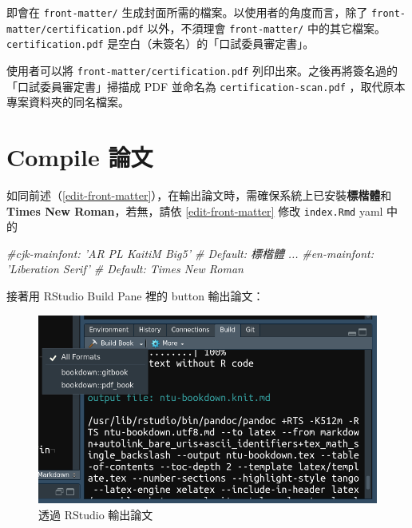 \documentclass[oneside]{book}
\newenvironment{Shaded}{\begin{snugshade}}{\end{snugshade}}
\newcommand{\CommentTok}[1]{\textcolor[rgb]{0.56,0.35,0.01}{\textit{#1}}}
\theoremstyle{definition}
\theoremstyle{definition}
\theoremstyle{definition}
\theoremstyle{remark}
\begin{document}
即會在 \texttt{front-matter/} 生成封面所需的檔案。以使用者的角度而言，除了 \texttt{front-matter/certification.pdf} 以外，不須理會 \texttt{front-matter/} 中的其它檔案。\texttt{certification.pdf} 是空白（未簽名）的「口試委員審定書」。

使用者可以將 \texttt{front-matter/certification.pdf} 列印出來。之後再將簽名過的「口試委員審定書」掃描成 PDF 並命名為 \texttt{certification-scan.pdf} ，取代原本專案資料夾的同名檔案。

\hypertarget{compile-thesis}{%
\section{Compile 論文}\label{compile-thesis}}

如同前述（\ref{edit-front-matter}），在輸出論文時，需確保系統上已安裝\textbf{標楷體}和 \textbf{Times New Roman}，若無，請依 \ref{edit-front-matter} 修改 \texttt{index.Rmd} yaml 中的

\begin{Shaded}
\begin{Highlighting}[]
\CommentTok{#cjk-mainfont: 'AR PL KaitiM Big5'  # Default: 標楷體}
\CommentTok{...}
\CommentTok{#en-mainfont: 'Liberation Serif'  # Default: Times New Roman}
\end{Highlighting}
\end{Shaded}

接著用 RStudio Build Pane 裡的 button 輸出論文：

\begin{figure}

{\centering \includegraphics[width=1\linewidth]{figs/build-button} 

}

\caption{透過 RStudio 輸出論文}\label{fig:unnamed-chunk-2}
\end{figure}
\end{document}
